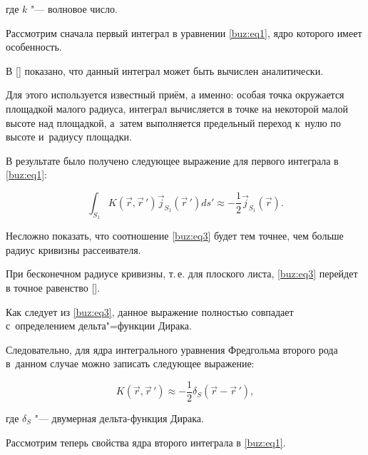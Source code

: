 где $k$ "--- волновое число.



\smallskip




Рассмотрим сначала первый интеграл в уравнении \eqref{buz:eq1}, ядро которого имеет особенность. 

В [] показано, что данный интеграл может быть вычислен аналитически. 

Для этого используется известный приём, а именно: особая точка окружается площадкой малого радиуса, интеграл вычисляется в точке на некоторой малой высоте над площадкой, а~затем выполняется предельный переход к~нулю по высоте и~радиусу площадки. 

В результате было получено следующее выражение для первого интеграла в \eqref{buz:eq1}:

\begin{equation}

\label{buz:eq3}

\int_{S_1}K(\vec{r},\vec{r}\,')\vec{j}_{S_1}(\vec{r}\,')ds'\approx-\frac1 2 \vec{j}_{S_1}(\vec{r}).

\end{equation}



Несложно показать, что соотношение \eqref{buz:eq3} будет тем точнее, чем больше  радиус кривизны рассеивателя. 

При бесконечном радиусе кривизны, т.\,е. для плоского листа, \eqref{buz:eq3}  перейдет в точное равенство [].



Как следует из \eqref{buz:eq3}, данное выражение полностью совпадает с~определением дельта"=функции Дирака. 

Следовательно, для ядра интегрального уравнения Фредгольма второго рода в~данном случае можно записать следующее выражение:

\begin{equation}

\label{buz:eq4} K(\vec{r},\vec{r}\,')\approx-\frac1 2 \delta_S(\vec{r}-\vec{r}\,'),

\end{equation}

где $\delta_S$ "--- двумерная дельта-функция Дирака.



Рассмотрим теперь свойства ядра второго интеграла в \eqref{buz:eq1}. 

